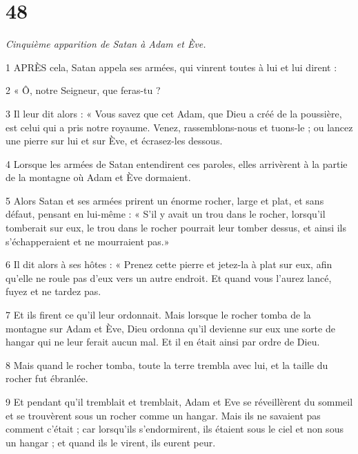 \chapter{48}

\par \textit{Cinquième apparition de Satan à Adam et Ève.}

\par 1 APRÈS cela, Satan appela ses armées, qui vinrent toutes à lui et lui dirent :

\par 2 « Ô, notre Seigneur, que feras-tu ?

\par 3 Il leur dit alors : « Vous savez que cet Adam, que Dieu a créé de la poussière, est celui qui a pris notre royaume. Venez, rassemblons-nous et tuons-le ; ou lancez une pierre sur lui et sur Ève, et écrasez-les dessous.

\par 4 Lorsque les armées de Satan entendirent ces paroles, elles arrivèrent à la partie de la montagne où Adam et Ève dormaient.

\par 5 Alors Satan et ses armées prirent un énorme rocher, large et plat, et sans défaut, pensant en lui-même : « S'il y avait un trou dans le rocher, lorsqu'il tomberait sur eux, le trou dans le rocher pourrait leur tomber dessus, et ainsi ils s'échapperaient et ne mourraient pas.»

\par 6 Il dit alors à ses hôtes : « Prenez cette pierre et jetez-la à plat sur eux, afin qu'elle ne roule pas d'eux vers un autre endroit. Et quand vous l’aurez lancé, fuyez et ne tardez pas.

\par 7 Et ils firent ce qu'il leur ordonnait. Mais lorsque le rocher tomba de la montagne sur Adam et Ève, Dieu ordonna qu'il devienne sur eux une sorte de hangar qui ne leur ferait aucun mal. Et il en était ainsi par ordre de Dieu.

\par 8 Mais quand le rocher tomba, toute la terre trembla avec lui, et la taille du rocher fut ébranlée.

\par 9 Et pendant qu'il tremblait et tremblait, Adam et Eve se réveillèrent du sommeil et se trouvèrent sous un rocher comme un hangar. Mais ils ne savaient pas comment c’était ; car lorsqu'ils s'endormirent, ils étaient sous le ciel et non sous un hangar ; et quand ils le virent, ils eurent peur.

